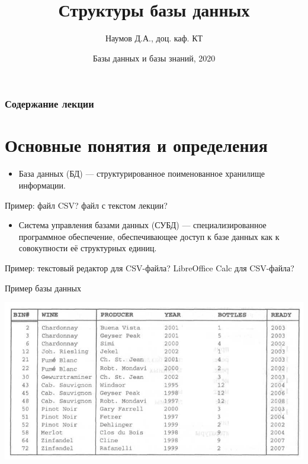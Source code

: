 \documentclass{beamer}
\title[СУБД]{Структуры базы данных}
\author{Наумов Д.А., доц. каф. КТ}
\date[15.02.2019] {Базы данных и базы знаний, 2020}
\begin{document}
\begin{frame}
  \titlepage
\end{frame}
  
\begin{frame}
  \frametitle{Содержание лекции}
  \tableofcontents  
\end{frame}

\section{Основные понятия и определения}
\begin{frame}
\begin{itemize}
\item База данных (БД) — структурированное поименованное хранилище информации.
\end{itemize}
Пример: файл CSV? файл с текстом лекции?
\begin{itemize}
\item Система управления базами данных (СУБД) — специализированное программное обеспечение, обеспечивающее доступ к базе данных как к совокупности её структурных единиц.
\end{itemize}
Пример: текстовый редактор для CSV-файла? LibreOffice Calc для CSV-файла?
\end{frame} 

\begin{frame}
\begin{block}{Пример базы данных}
\begin{center}
\includegraphics[scale=0.5]{images/example-01.png}
\end{center}
\end{block}
\end{frame} 
\end{document}
